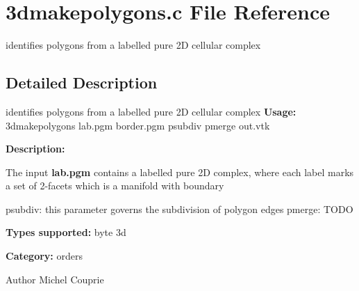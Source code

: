 \section{3dmakepolygons.c File Reference}
\label{3dmakepolygons_8c}


identifies polygons from a labelled pure 2D cellular complex  




\subsection{Detailed Description}
identifies polygons from a labelled pure 2D cellular complex {\bfseries Usage:} 3dmakepolygons lab.pgm border.pgm psubdiv pmerge out.vtk

{\bfseries Description:}

The input {\bfseries lab.pgm} contains a labelled pure 2D complex, where each label marks a set of 2-\/facets which is a manifold with boundary

psubdiv: this parameter governs the subdivision of polygon edges pmerge: TODO

{\bfseries Types supported:} byte 3d

{\bfseries Category:} orders

\begin{DoxyAuthor}{Author}
Michel Couprie 
\end{DoxyAuthor}
